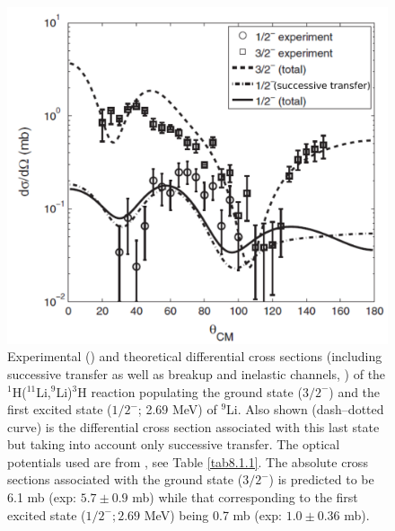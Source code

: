  \begin{figure}
 	\centerline{\includegraphics*[width=12cm,angle=0]{C8/figsC8/fig8_B_2}}
 	\caption{Experimental (\cite{Tanihata:08}) and theoretical differential cross sections (including successive transfer as well as breakup and inelastic channels, \cite{Potel:10})  of the
 		$^1$H($^{11}$Li,$^9$Li)$^3$H  reaction populating the ground state ($3/2^-$) and the first excited state ($1/2^-$; 2.69 MeV) of $^{9}$Li. Also shown (dash--dotted curve) is the differential cross section associated with this last state but taking into account only successive transfer. The optical potentials used are from \citep{Tanihata:08,An:06}, see Table \ref{tab8.1.1}. The absolute cross sections associated with the ground state ($3/2^-$) is predicted to be 6.1 mb (exp: $5.7\pm 0.9$ mb) while that corresponding to the first excited state ($1/2^-; 2.69$ MeV) being 0.7 mb (exp: $1.0\pm 0.36$ mb). }\label{fig8_B_2}
 \end{figure}
